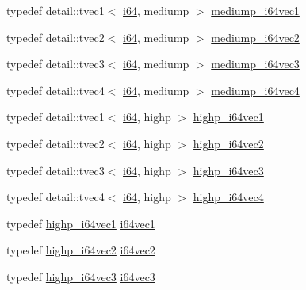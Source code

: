 \begin{CompactItemize}
\item 
typedef detail::tvec1$<$ \hyperlink{group__gtc__type__precision_gc7a7eaad46064fc952b06df33689da23}{i64}, mediump $>$ \hyperlink{group__gtc__type__precision_gd2423a91c791b9ca2f8a3ecfc71b080d}{mediump\_\-i64vec1}
\item 
typedef detail::tvec2$<$ \hyperlink{group__gtc__type__precision_gc7a7eaad46064fc952b06df33689da23}{i64}, mediump $>$ \hyperlink{group__gtc__type__precision_g5cf0bec13b01b6124e966360cffe15a4}{mediump\_\-i64vec2}
\item 
typedef detail::tvec3$<$ \hyperlink{group__gtc__type__precision_gc7a7eaad46064fc952b06df33689da23}{i64}, mediump $>$ \hyperlink{group__gtc__type__precision_ge1aa82d2b9a62a87648306205dfe69ab}{mediump\_\-i64vec3}
\item 
typedef detail::tvec4$<$ \hyperlink{group__gtc__type__precision_gc7a7eaad46064fc952b06df33689da23}{i64}, mediump $>$ \hyperlink{group__gtc__type__precision_gb4db11ebb425fa18fe5d15d455c360a3}{mediump\_\-i64vec4}
\item 
typedef detail::tvec1$<$ \hyperlink{group__gtc__type__precision_gc7a7eaad46064fc952b06df33689da23}{i64}, highp $>$ \hyperlink{group__gtc__type__precision_g06c21aba992669f5c160ec5f5a480522}{highp\_\-i64vec1}
\item 
typedef detail::tvec2$<$ \hyperlink{group__gtc__type__precision_gc7a7eaad46064fc952b06df33689da23}{i64}, highp $>$ \hyperlink{group__gtc__type__precision_gbfe3aa6fa4003a47577beb9678ab2661}{highp\_\-i64vec2}
\item 
typedef detail::tvec3$<$ \hyperlink{group__gtc__type__precision_gc7a7eaad46064fc952b06df33689da23}{i64}, highp $>$ \hyperlink{group__gtc__type__precision_g4030f8ad15da56f5e427aa457d39e888}{highp\_\-i64vec3}
\item 
typedef detail::tvec4$<$ \hyperlink{group__gtc__type__precision_gc7a7eaad46064fc952b06df33689da23}{i64}, highp $>$ \hyperlink{group__gtc__type__precision_g0ea279cd954fbb71a1db62e897d4d7f5}{highp\_\-i64vec4}
\item 
typedef \hyperlink{group__gtc__type__precision_g06c21aba992669f5c160ec5f5a480522}{highp\_\-i64vec1} \hyperlink{group__gtc__type__precision_g8bc234da7e4a6436e01241f439fc7ddd}{i64vec1}
\item 
typedef \hyperlink{group__gtc__type__precision_gbfe3aa6fa4003a47577beb9678ab2661}{highp\_\-i64vec2} \hyperlink{group__gtc__type__precision_g75461c98baf3e3913566550bd9d8d17f}{i64vec2}
\item 
typedef \hyperlink{group__gtc__type__precision_g4030f8ad15da56f5e427aa457d39e888}{highp\_\-i64vec3} \hyperlink{group__gtc__type__precision_gb6eefcd7eb24e4142ed23dc1e87163a6}{i64vec3}

\end{CompactItemize}
